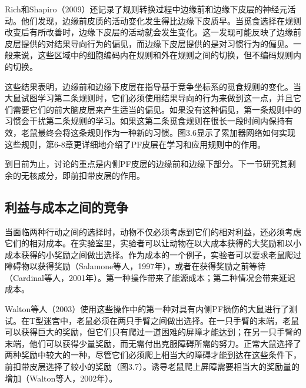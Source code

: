 Rich和Shapiro（2009）还记录了规则转换过程中边缘前和边缘下皮层的神经元活动。他们发现，边缘前皮质的活动变化发生得比边缘下皮质早。当觅食选择在规则改变后有所改善时，边缘下皮层的活动就会发生变化。这一发现可能反映了边缘前皮层提供的对结果导向行为的偏见，而边缘下皮层提供的是对习惯行为的偏见。一般来说，这些区域中的细胞编码内在规则和外在规则之间的切换，但不编码规则内的切换。\par
这些结果表明，边缘前和边缘下皮层在指导基于竞争坐标系的觅食规则的变化。当大鼠试图学习第二条规则时，它们必须使用结果导向的行为来做到这一点，并且它们需要它们的前大脑皮层来产生适当的偏见。如果没有这种偏见，第一条规则中的习惯会干扰第二条规则的学习。如果这第二条觅食规则在很长一段时间内保持有效，老鼠最终会将这条规则作为一种新的习惯。图3.6显示了累加器网络如何实现这些规则，第6-8章更详细地介绍了PF皮层在学习和应用规则中的作用。\par
到目前为止，讨论的重点是内侧PF皮层的边缘前和边缘下部分。下一节研究其剩余的无核成分，即前扣带皮层的作用。\par

\subsection{利益与成本之间的竞争}
当面临两种行动之间的选择时，动物不仅必须考虑到它们的相对利益，还必须考虑它们的相对成本。在实验室里，实验者可以让动物在以大成本获得的大奖励和以小成本获得的小奖励之间做出选择。作为成本的一个例子，实验者可以要求老鼠爬过障碍物以获得奖励（Salamone等人，1997年），或者在获得奖励之前等待（Cardinal等人，2001年）。第一种操作带来了能源成本；第二种情况会带来延迟成本。\par
Walton等人（2003）使用这些操作中的第一种对具有内侧PF损伤的大鼠进行了测试。在T型迷宫中，老鼠必须在两只手臂之间做出选择。在一只手臂的末端，老鼠可以获得巨大的奖励，但它们只有爬过一道困难的屏障才能达到；在另一只手臂的末端，他们可以获得少量奖励，而无需付出克服障碍所需的努力。正常大鼠选择了两种奖励中较大的一种，尽管它们必须爬上相当大的障碍才能到达在这些条件下，前扣带皮层选择了较小的奖励（图3.7）。诱导老鼠爬上屏障需要相当大的奖励量的增加（Walton等人，2002年）。\par

